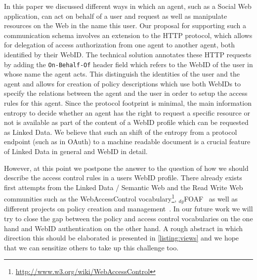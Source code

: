 \documentclass[a4paper]{llncs}
\begin{document}
In this paper we discussed different ways in which an agent, such as a Social Web application, can act on behalf of a user and request as well as manipulate resources on the Web in the name this user.
Our proposal for supporting such a communication schema involves an extension to the HTTP protocol, which allows for delegation of access authorization from one agent to another agent, both identified by their WebID.
The technical solution annotates these HTTP requests by adding the \lstinline|On-Behalf-Of| header field which refers to the WebID of the user in whose name the agent acts.
This distinguish the identities of the user and the agent and allows for creation of policy descriptions which use both WebIDs to specify the relations between the agent and the user in order to setup the access rules for this agent.
Since the protocol footprint is minimal, the main information entropy to decide whether an agent has the right to request a specific resource or not is available as part of the content of a WebID profile which can be requested as Linked Data.
We believe that such an shift of the entropy from a protocol endpoint (such as in OAuth) to a machine readable document is a crucial feature of Linked Data in general and WebID in detail.

However, at this point we postpone the answer to the question of how we should describe the access control rules in a users WebID profile.
There already exists first attempts from the Linked Data / Semantic Web and the Read Write Web communities such as the WebAccessControl vocabulary\footnote{\url{http://www.w3.org/wiki/WebAccessControl}}, $_{dg}$FOAF~\cite{schwagereit-f-2010-181-a} as well as different projects on policy creation and management~\cite{kagal-l-2005--a}.
In our future work we will try to close the gap between the policy and access control vocabularies on the one hand and WebID authentication on the other hand.
A rough abstract in which direction this should be elaborated is presented in \autoref{listing:views} and we hope that we can sensitize others to take up this challenge too.



\end{document}
